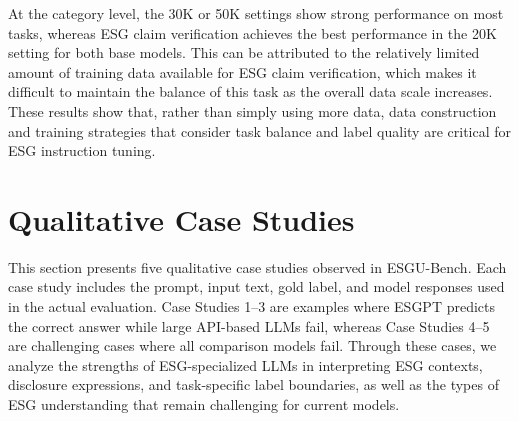 \documentclass[11pt]{article}
\begin{document}
At the category level, the 30K or 50K settings show strong performance on most tasks, whereas ESG claim verification achieves the best performance in the 20K setting for both base models. This can be attributed to the relatively limited amount of training data available for ESG claim verification, which makes it difficult to maintain the balance of this task as the overall data scale increases. These results show that, rather than simply using more data, data construction and training strategies that consider task balance and label quality are critical for ESG instruction tuning.


\section{Qualitative Case Studies}
\label{app:case_studies}
This section presents five qualitative case studies observed in \textsf{ESGU-Bench}. Each case study includes the prompt, input text, gold label, and model responses used in the actual evaluation. Case Studies 1--3 are examples where \textsf{ESGPT} predicts the correct answer while large API-based LLMs fail, whereas Case Studies 4--5 are challenging cases where all comparison models fail. Through these cases, we analyze the strengths of ESG-specialized LLMs in interpreting ESG contexts, disclosure expressions, and task-specific label boundaries, as well as the types of ESG understanding that remain challenging for current models.
\end{document}
